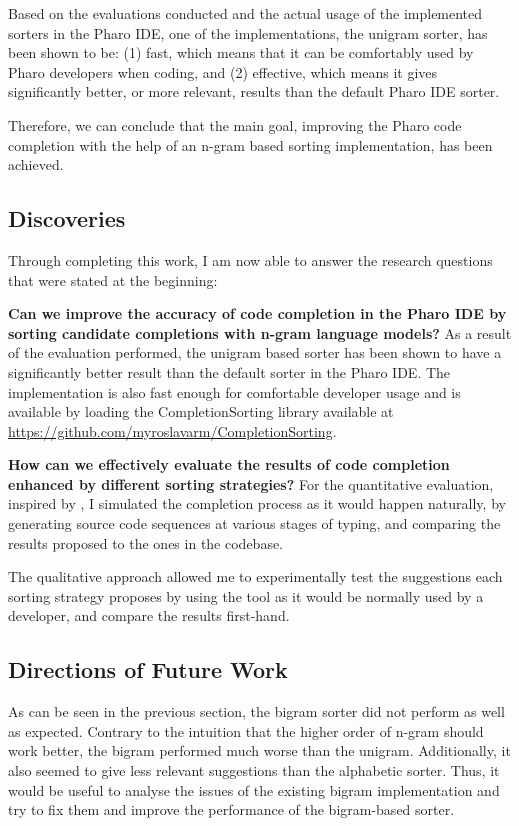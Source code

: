 \documentclass[sigplan,screen]{acmart}
\begin{document}
Based on the evaluations conducted and the actual usage of the implemented sorters in the Pharo IDE, one of the implementations, the unigram sorter, has been shown to be: (1) fast, which means that it can be comfortably used by Pharo developers when coding, and (2) effective, which means it gives significantly better, or more relevant, results than the default Pharo IDE sorter.

Therefore, we can conclude that the main goal, improving the Pharo code completion with the help of an n-gram based sorting implementation, has been achieved.

\subsection{Discoveries}
Through completing this work, I am now able to answer the research questions that were stated at the beginning:
\begin{RQ}
    \item \textbf{Can we improve the accuracy of code completion in the Pharo IDE by sorting candidate completions with n-gram language models?} As a result of the evaluation performed, the unigram based sorter has been shown to have a significantly better result than the default sorter in the Pharo IDE. The implementation is also fast enough for comfortable developer usage and is available by loading the CompletionSorting library available at \url{https://github.com/myroslavarm/CompletionSorting}.
    \item \textbf{How can we effectively evaluate the results of code completion enhanced by different sorting strategies?} For the quantitative evaluation, inspired by \cite{Robb08a}, I simulated the completion process as it would happen naturally, by generating source code sequences at various stages of typing, and comparing the results proposed to the ones in the codebase.
    
    The qualitative approach allowed me to experimentally test the suggestions each sorting strategy proposes by using the tool as it would be normally used by a developer, and compare the results first-hand.
\end{RQ}

\subsection{Directions of Future Work}
As can be seen in the previous section, the bigram sorter did not perform as well as expected. Contrary to the intuition that the higher order of n-gram should work better, the bigram performed much worse than the unigram. Additionally, it also seemed to give less relevant suggestions than the alphabetic sorter. Thus, it would be useful to analyse the issues of the existing bigram implementation and try to fix them and improve the performance of the bigram-based sorter. 
\end{document}
